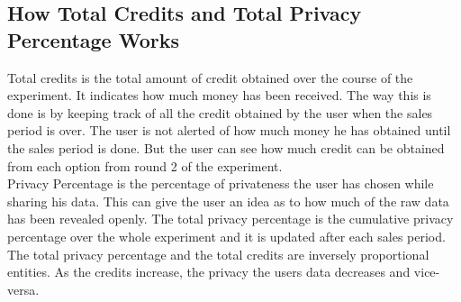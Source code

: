 \subsection{How Total Credits and Total Privacy Percentage Works}
Total credits is the total amount of credit obtained over the course of the experiment. It indicates how much money has been received. The way this is done
is by keeping track of all the credit obtained by the user when the sales period is over. The user is not alerted of how much money he has obtained until the sales period is done.
But the user can see how much credit can be obtained from each option from round 2 of the experiment.\\
Privacy Percentage is the percentage of privateness the user has chosen while sharing his data. This can give the user an idea as to
how much of the raw data has been revealed openly. The total privacy percentage is the cumulative privacy percentage over the whole experiment and it is updated after each sales period.
The total privacy percentage and the total credits are inversely proportional entities. As the credits increase, the privacy the users data decreases and vice-versa.